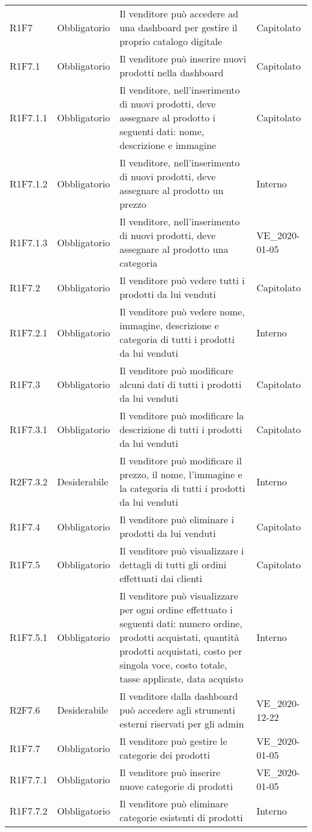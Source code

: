 {\begin{longtable}{C{2.5cm} C{2.8cm} C{6.7cm} C{2.5cm}}
R1F7 & Obbligatorio & Il venditore può accedere ad una dashboard per gestire il proprio catalogo digitale & Capitolato \\
R1F7.1 & Obbligatorio & Il venditore può inserire nuovi prodotti nella dashboard & Capitolato \\
R1F7.1.1 & Obbligatorio & Il venditore, nell'inserimento di nuovi prodotti, deve assegnare al prodotto i seguenti dati: nome, descrizione e immagine & Capitolato \\
R1F7.1.2 & Obbligatorio & Il venditore, nell'inserimento di nuovi prodotti, deve assegnare al prodotto un prezzo & Interno \\ 
R1F7.1.3 & Obbligatorio & Il venditore, nell'inserimento di nuovi prodotti, deve assegnare al prodotto una categoria & VE\_2020-01-05 \\ 
R1F7.2 & Obbligatorio & Il venditore può vedere tutti i prodotti da lui venduti & Capitolato \\
R1F7.2.1 & Obbligatorio & Il venditore può vedere nome, immagine, descrizione e categoria di tutti i prodotti da lui venduti & Interno \\
R1F7.3 & Obbligatorio & Il venditore può modificare alcuni dati di tutti i prodotti da lui venduti & Capitolato \\
R1F7.3.1 & Obbligatorio & Il venditore può modificare la descrizione di tutti i prodotti da lui venduti & Capitolato \\
R2F7.3.2 & Desiderabile & Il venditore può modificare il prezzo, il nome, l'immagine e la categoria di tutti i prodotti da lui venduti & Interno \\
R1F7.4 & Obbligatorio & Il venditore può eliminare i prodotti da lui venduti & Capitolato \\
R1F7.5 & Obbligatorio & Il venditore può visualizzare i dettagli di tutti gli ordini effettuati dai clienti & Capitolato \\
R1F7.5.1 & Obbligatorio & Il venditore può visualizzare per ogni ordine effettuato i seguenti dati: numero ordine, prodotti acquistati, quantità prodotti acquistati, costo per singola voce, costo totale, tasse applicate, data acquisto & Interno \\
R2F7.6 & Desiderabile & Il venditore dalla dashboard può accedere agli strumenti esterni riservati per gli admin & VE\_2020-12-22 \\
R1F7.7 & Obbligatorio & Il venditore può gestire le categorie dei prodotti & VE\_2020-01-05 \\
R1F7.7.1 & Obbligatorio & Il venditore può inserire nuove categorie di prodotti & VE\_2020-01-05 \\
R1F7.7.2 & Obbligatorio & Il venditore può eliminare categorie esistenti di prodotti & Interno \\


\end{longtable}}
